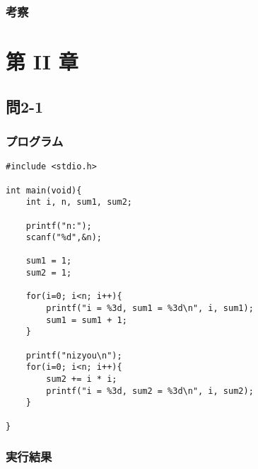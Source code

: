 \documentclass{jarticle}
\begin{document}
\subsubsection{考察\\}

\section{第 II 章\\}

\subsection{問2-1\\}
\subsubsection{プログラム\\}
\begin{breakbox}
\begin{verbatim}
#include <stdio.h>

int main(void){
	int i, n, sum1, sum2;

	printf("n:");
	scanf("%d",&n);

	sum1 = 1;
	sum2 = 1;

	for(i=0; i<n; i++){
		printf("i = %3d, sum1 = %3d\n", i, sum1);
		sum1 = sum1 + 1;
	}

	printf("nizyou\n");
	for(i=0; i<n; i++){
		sum2 += i * i;
		printf("i = %3d, sum2 = %3d\n", i, sum2);
	}

}
\end{verbatim}
\end{breakbox}
\subsubsection{実行結果\\}

\begin{breakbox}
\begin{verbatim}
\end{verbatim}
\end{breakbox}


\begin{breakbox}
\begin{verbatim}
\end{verbatim}
\end{breakbox}



\begin{breakbox}
\begin{verbatim}
\end{verbatim}
\end{breakbox}

\begin{breakbox}
\begin{verbatim}
\end{verbatim}
\end{breakbox}

\begin{breakbox}
\begin{verbatim}
\end{verbatim}
\end{breakbox}
\begin{breakbox}
\begin{verbatim}
\end{verbatim}
\end{breakbox}
\end{document}
